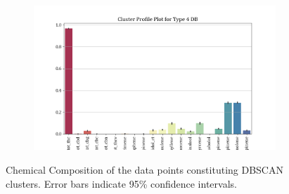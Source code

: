 \documentclass[11pt,a4paper]{article}
\begin{document}
\begin{figure}[H]
\begin{subfigure}[b]{0.475\textwidth}
         \label{fig:db_clust_3}
     \end{subfigure}
     \hfill
     \begin{subfigure}[b]{0.475\textwidth}
         \centering
         \includegraphics[width=\textwidth]{images/db_chem_composition_4.png}
         \label{fig:db_clust_4}
     \end{subfigure}
    \caption{Chemical Composition of the data points constituting DBSCAN clusters. Error bars indicate 95\% confidence intervals.}
    \label{fig:dbscan_cc}
\end{figure}
\end{document}
